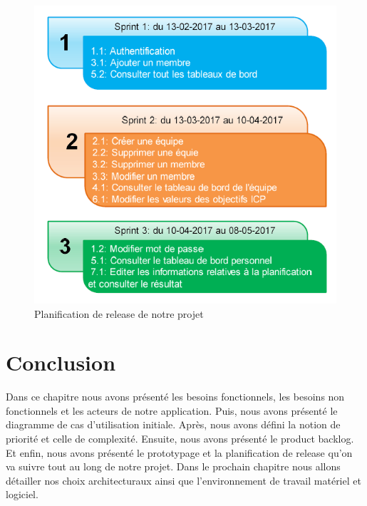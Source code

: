 \begin{figure}[H]
\centering
\includegraphics[scale=0.9]{figures/sprints_release_planification.png}
\caption{Planification de release de notre projet}
\label{code19}
\end{figure}
\section{Conclusion}
Dans ce chapitre nous avons présenté les besoins fonctionnels, les besoins non fonctionnels et les acteurs de notre application. Puis, nous avons présenté le diagramme de cas d'utilisation initiale. Après, nous avons défini la notion de priorité et celle de complexité. Ensuite, nous avons présenté le product backlog. Et enfin, nous avons présenté le prototypage et la planification de release qu'on va suivre tout au long de notre projet. Dans le prochain chapitre nous allons détailler nos choix architecturaux ainsi que l'environnement de travail matériel et logiciel.